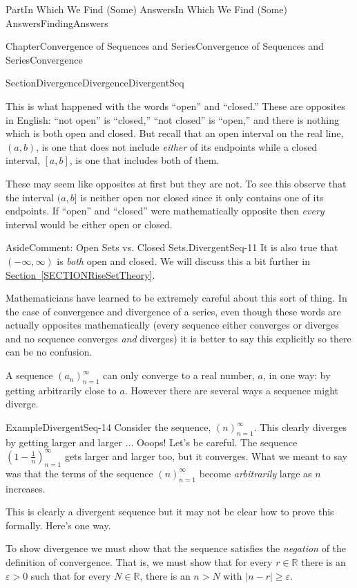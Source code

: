 \documentclass[oneside,10pt,]{book}
\newcommand{\xreffont}{\relax}
\numberwithin{equation}{part}
\newcommand{\eps}{\varepsilon}
\newcommand{\RR}{\mathbb {R}}
\begin{document}
\begin{partptx}{Part}{In Which We Find (Some) Answers}{}{In Which We Find (Some) Answers}{}{}{FindingAnswers}
\begin{chapterptx}{Chapter}{Convergence of Sequences and Series}{}{Convergence of Sequences and Series}{}{}{Convergence}
\begin{sectionptx}{Section}{Divergence}{}{Divergence}{}{}{DivergentSeq}
\par
This is what happened with the words ``open'' and ``closed.'' These are opposites in English: ``not open'' is ``closed,'' ``not closed'' is ``open,'' and there is nothing which is both open and closed. But recall that an open interval on the real line, \((a,b)\), is one that does not include \emph{either} of its endpoints while a closed interval, \([a,b]\), is one that includes both of them.%
\par
These may seem like opposites at first but they are not.  To see this observe that the interval \((a,b]\) is neither open nor closed since it only contains one of its endpoints. If ``open'' and ``closed'' were mathematically opposite then \emph{every} interval would be either open or closed.%
\begin{aside}{Aside}{Comment: Open Sets vs. Closed Sets.}{DivergentSeq-11}%
It is also true that \((-\infty,\infty)\) is \emph{both} open and closed. We will discuss this a bit further in \hyperref[SECTIONRiseSetTheory]{Section~{\xreffont\ref{SECTIONRiseSetTheory}}}.%
\end{aside}
Mathematicians have learned to be extremely careful about this sort of thing. In the case of convergence and divergence of a series, even though these words are actually opposites mathematically (every sequence either converges or diverges and no sequence converges \emph{and} diverges) it is better to say this explicitly so there can be no confusion.%
\par
A sequence \(\left(a_n\right)_{n=1}^\infty\) can only converge to a real number, \(a\), in one way: by getting arbitrarily close to \(a\). However there are several ways a sequence might diverge.%
\begin{example}{Example}{}{DivergentSeq-14}%
Consider the sequence, \(\left(n\right)_{n=1}^\infty\). This clearly diverges by getting larger and larger \(\ldots\) Ooops! Let's be careful. The sequence \(\left(1-\frac1n\right)_{n=1}^\infty\) gets larger and larger too, but it converges. What we meant to say was that the terms of the sequence \(\left(n\right)_{n=1}^\infty\) become \emph{arbitrarily} large as \(n\) increases.%
\par
This is clearly a divergent sequence but it may not be clear how to prove this formally. Here's one way.%
\par
To show divergence we must show that the sequence satisfies the \emph{negation} of the definition of convergence. That is, we must show that for every \(r\in\RR\) there is an \(\eps>0\) such that for every \(N\in\RR\), there is an \(n>N\) with \(\left|n-r\right|\ge\eps\).%

\end{example}
\end{sectionptx}
\end{chapterptx}
\end{partptx}
\end{document}
